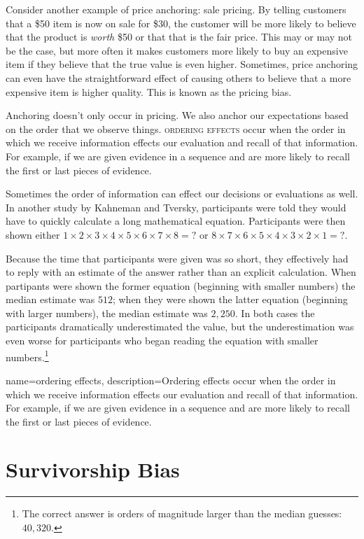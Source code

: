 Consider another example of price anchoring: sale pricing. By telling customers that a \$50 item is now on sale for \$30, the customer will be more likely to believe that the product is \emph{worth} \$50 or that that is the fair price. This may or may not be the case, but more often it makes customers more likely to buy an expensive item if they believe that the true value is even higher. Sometimes, price anchoring can even have the straightforward effect of causing others to believe that a more expensive item is higher quality. This is known as the pricing bias.

Anchoring doesn't only occur in pricing. We also anchor our expectations based on the order that we observe things. \textsc{\Gls{ordering effects}} occur when the order in which we receive information effects our evaluation and recall of that information. For example, if we are given evidence in a sequence and are more likely to recall the first or last pieces of evidence.

Sometimes the order of information can effect our decisions or evaluations as well. In another study by Kahneman and Tversky, participants were told they would have to quickly calculate a long mathematical equation. Participants were then shown either $1\times 2\times 3\times 4\times 5\times 6\times 7\times 8 = ?$ or  $ 8\times 7\times 6\times 5\times 4\times 3\times 2\times 1 = ?$.

Because the time that participants were given was so short, they effectively had to reply with an estimate of the answer rather than an explicit calculation. When partipants were shown the former equation (beginning with smaller numbers) the median estimate was $512$; when they were shown the latter equation (beginning with larger numbers), the median estimate was $2,250$. In both cases the participants dramatically underestimated the value, but the underestimation was even worse for participants who began reading the equation with smaller numbers.\footnote{The correct answer is orders of magnitude larger than the median guesses: $40,320$.}

{
name=ordering effects,
description={Ordering effects occur when the order in which we receive information effects our evaluation and recall of that information. For example, if we are given evidence in a sequence and are more likely to recall the first or last pieces of evidence.}
}

\section{Survivorship Bias}

